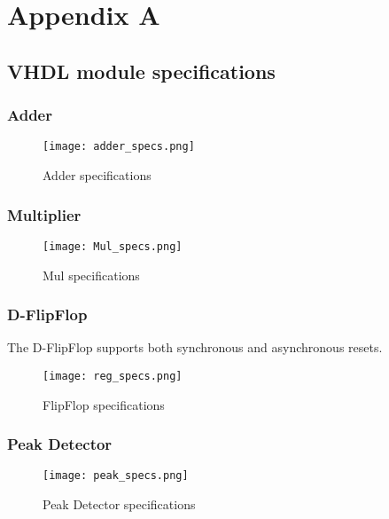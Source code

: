 \chapter{Appendix A}
\section{VHDL module specifications}

\subsection{Adder}

\begin{figure}[h]
    \centering
    \texttt{[image: adder\_specs.png]}
    \caption{Adder specifications}
    \label{fig:adder_specs}
\end{figure}

\subsection{Multiplier}

\begin{figure}[h]
    \centering
    \texttt{[image: Mul\_specs.png]}
    \caption{Mul specifications}
    \label{fig:mul_specs}
\end{figure}

\subsection{D-FlipFlop}

The D-FlipFlop supports both synchronous and asynchronous resets.

\begin{figure}[h]
    \centering
    \texttt{[image: reg\_specs.png]}
    \caption{FlipFlop specifications}
    \label{fig:reg_specs}
\end{figure}

\subsection{Peak Detector}

\begin{figure}[h]
    \centering
    \texttt{[image: peak\_specs.png]}
    \caption{Peak Detector specifications}
    \label{fig:peak_specs}
\end{figure}



